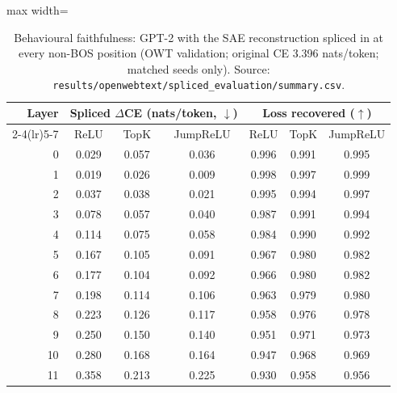 \begin{table}[t]
\centering
\small
\caption{Behavioural faithfulness: GPT-2 with the SAE reconstruction spliced in at every non-BOS position (OWT validation; original CE 3.396 nats/token; matched seeds only). Source: \texttt{results/\allowbreak{}openwebtext/\allowbreak{}spliced\_evaluation/\allowbreak{}summary.csv}.}
\label{tab:splice}
\begin{adjustbox}{max width=\linewidth}
\begin{tabular}{rcccccc}
\toprule
Layer & \multicolumn{3}{c}{Spliced $\Delta$CE (nats/token, $\downarrow$)} & \multicolumn{3}{c}{Loss recovered ($\uparrow$)} \\
\cmidrule(lr){2-4}\cmidrule(lr){5-7}
 & ReLU & TopK & JumpReLU & ReLU & TopK & JumpReLU \\
\midrule
0 & 0.029 & 0.057 & 0.036 & 0.996 & 0.991 & 0.995 \\
1 & 0.019 & 0.026 & 0.009 & 0.998 & 0.997 & 0.999 \\
2 & 0.037 & 0.038 & 0.021 & 0.995 & 0.994 & 0.997 \\
3 & 0.078 & 0.057 & 0.040 & 0.987 & 0.991 & 0.994 \\
4 & 0.114 & 0.075 & 0.058 & 0.984 & 0.990 & 0.992 \\
5 & 0.167 & 0.105 & 0.091 & 0.967 & 0.980 & 0.982 \\
6 & 0.177 & 0.104 & 0.092 & 0.966 & 0.980 & 0.982 \\
7 & 0.198 & 0.114 & 0.106 & 0.963 & 0.979 & 0.980 \\
8 & 0.223 & 0.126 & 0.117 & 0.958 & 0.976 & 0.978 \\
9 & 0.250 & 0.150 & 0.140 & 0.951 & 0.971 & 0.973 \\
10 & 0.280 & 0.168 & 0.164 & 0.947 & 0.968 & 0.969 \\
11 & 0.358 & 0.213 & 0.225 & 0.930 & 0.958 & 0.956 \\
\bottomrule
\end{tabular}
\end{adjustbox}
\end{table}
